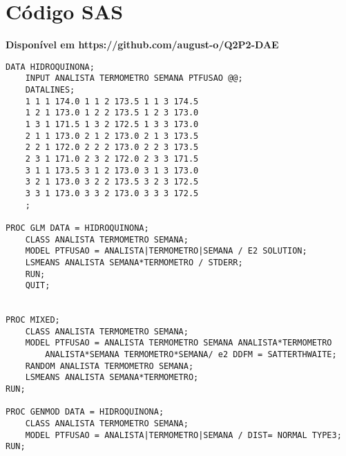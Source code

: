 \documentclass[12pt]{article}
\begin{document}
\section*{Código SAS}
\textbf{Disponível em https://github.com/august-o/Q2P2-DAE}
\begin{lstlisting}
DATA HIDROQUINONA;
	INPUT ANALISTA TERMOMETRO SEMANA PTFUSAO @@;
	DATALINES;
	1 1 1 174.0 1 1 2 173.5 1 1 3 174.5 
	1 2 1 173.0 1 2 2 173.5 1 2 3 173.0
	1 3 1 171.5 1 3 2 172.5 1 3 3 173.0
	2 1 1 173.0 2 1 2 173.0 2 1 3 173.5
	2 2 1 172.0 2 2 2 173.0 2 2 3 173.5
	2 3 1 171.0 2 3 2 172.0 2 3 3 171.5
	3 1 1 173.5 3 1 2 173.0 3 1 3 173.0
	3 2 1 173.0 3 2 2 173.5 3 2 3 172.5
	3 3 1 173.0 3 3 2 173.0 3 3 3 172.5
	;
	
PROC GLM DATA = HIDROQUINONA;
	CLASS ANALISTA TERMOMETRO SEMANA;
	MODEL PTFUSAO = ANALISTA|TERMOMETRO|SEMANA / E2 SOLUTION;
	LSMEANS ANALISTA SEMANA*TERMOMETRO / STDERR;
	RUN; 
    QUIT;
	
	
PROC MIXED;
	CLASS ANALISTA TERMOMETRO SEMANA;
	MODEL PTFUSAO = ANALISTA TERMOMETRO SEMANA ANALISTA*TERMOMETRO
    	ANALISTA*SEMANA TERMOMETRO*SEMANA/ e2 DDFM = SATTERTHWAITE;
	RANDOM ANALISTA TERMOMETRO SEMANA;
	LSMEANS ANALISTA SEMANA*TERMOMETRO;
RUN;
	
PROC GENMOD DATA = HIDROQUINONA;
	CLASS ANALISTA TERMOMETRO SEMANA;
	MODEL PTFUSAO = ANALISTA|TERMOMETRO|SEMANA / DIST= NORMAL TYPE3;
RUN;
\end{lstlisting}
\end{document}
